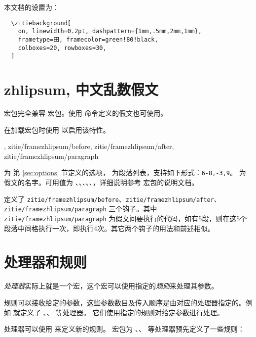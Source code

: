 \documentclass{ctxdoc}
\begin{document}
本文档的设置为：
\begin{verbatim}
  \zitiebackground[
    on, linewidth=0.2pt, dashpattern={1mm,.5mm,2mm,1mm},
    frametype=田, framecolor=green!80!black,
    colboxes=20, rowboxes=30,
  ]
\end{verbatim}

\section{zhlipsum, 中文乱数假文}

 宏包完全兼容  宏包\cite{pkg-zhlipsum}。使用  命令定义的假文也可使用。

在加载宏包时使用  以启用该特性。

\begin{function}{
  \framezhlipsum,
  zitie/framezhlipsum/before,
  zitie/framezhlipsum/after,
  zitie/framezhlipsum/paragraph
}
  \begin{syntax}
       
  \end{syntax}
   为  第 \ref{sec:options} 节定义的选项， 为段落列表，支持如下形式：\verb|6-8,-3,9|。 为假文的名字。可用值为 、、、、、，详细说明参考  宏包的说明文档。

  定义了 \verb|zitie/framezhlipsum/before|、\verb|zitie/framezhlipsum/after|、\verb|zitie/framezhlipsum/paragraph| 三个钩子。其中 \verb|zitie/framezhlipsum/paragraph| 为假文间要执行的代码，如有5段，则在这5个段落中间格执行一次，即执行4次。其它两个钩子的用法和前述相似。
\end{function}


\section{处理器和规则}\label{sec:processors}

\emph{处理器}实际上就是一个宏，这个宏可以使用指定的\emph{规则}来处理其参数。

规则可以接收给定的参数，这些参数数目及传入顺序是由对应的处理器指定的。例如  就定义了 、、 等处理器。
它们使用指定的规则对给定参数进行处理。

处理器可以使用  来定义新的规则。 宏包为 、、 等处理器预先定义了一些规则：
\end{document}
